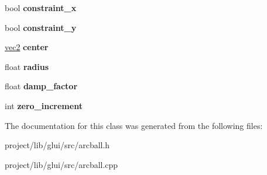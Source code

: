 \begin{DoxyCompactItemize}
\item 
\hypertarget{classArcball_aaeed50eff2338720a5ccc6530e28e941}{bool {\bfseries constraint\-\_\-x}}\label{classArcball_aaeed50eff2338720a5ccc6530e28e941}

\item 
\hypertarget{classArcball_aa46718d1b438010622664c65f7412c2e}{bool {\bfseries constraint\-\_\-y}}\label{classArcball_aa46718d1b438010622664c65f7412c2e}

\item 
\hypertarget{classArcball_ac196c376b8f265704033938b0d6a7b6d}{\hyperlink{classvec2}{vec2} {\bfseries center}}\label{classArcball_ac196c376b8f265704033938b0d6a7b6d}

\item 
\hypertarget{classArcball_aed2e9c177c4f650e9aef6f3050972f6a}{float {\bfseries radius}}\label{classArcball_aed2e9c177c4f650e9aef6f3050972f6a}

\item 
\hypertarget{classArcball_a0b3b8f1e4f37e60ad3138ea41e0d0f13}{float {\bfseries damp\-\_\-factor}}\label{classArcball_a0b3b8f1e4f37e60ad3138ea41e0d0f13}

\item 
\hypertarget{classArcball_a5cb4b94f265115a4a60027071a123b8f}{int {\bfseries zero\-\_\-increment}}\label{classArcball_a5cb4b94f265115a4a60027071a123b8f}

\end{DoxyCompactItemize}


The documentation for this class was generated from the following files\-:\begin{DoxyCompactItemize}
\item 
project/lib/glui/src/arcball.\-h\item 
project/lib/glui/src/arcball.\-cpp\end{DoxyCompactItemize}
